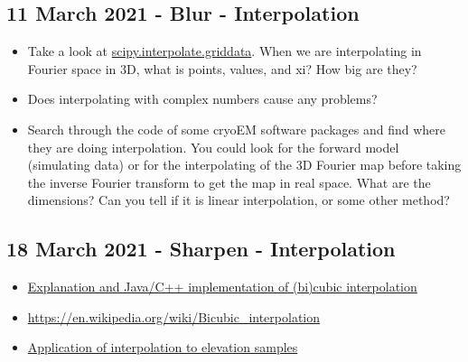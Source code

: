 \documentclass[11pt, oneside]{article}   	%
\begin{document}
\subsection{11 March 2021 - Blur - Interpolation}

\begin{itemize}
	\item Take a look at \href{https://docs.scipy.org/doc/scipy/reference/generated/scipy.interpolate.griddata.html}{scipy.interpolate.griddata}. When we are interpolating in Fourier space in 3D, what is points, values, and xi? How big are they?
	\item Does interpolating with complex numbers cause any problems?
	\item Search through the code of some cryoEM software packages and find where they are doing interpolation. You could look for the forward model (simulating data) or for the interpolating of the 3D Fourier map before taking the inverse Fourier transform to get the map in real space. What are the dimensions? Can you tell if it is linear interpolation, or some other method?
\end{itemize}

\subsection{18 March 2021 - Sharpen - Interpolation}
\begin{itemize}
	\item \href{https://www.paulinternet.nl/?page=bicubic}{Explanation and Java/C++ implementation of (bi)cubic interpolation}
	\item \url{https://en.wikipedia.org/wiki/Bicubic_interpolation}
	\item \href{https://web.archive.org/web/20051024202307/http://www.geovista.psu.edu/sites/geocomp99/Gc99/082/gc_082.htm}{Application of interpolation to elevation samples}
\end{itemize}
\end{document}
